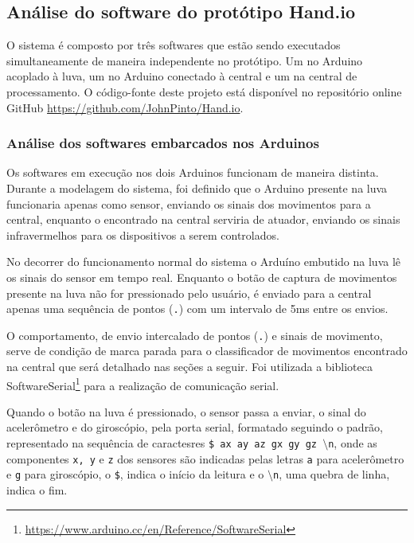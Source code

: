\subsection{Análise do software do protótipo Hand.io}

O sistema é composto por três softwares que estão sendo executados simultaneamente de maneira independente no protótipo. Um no Arduino acoplado à luva, um no Arduino conectado à central e um na central de processamento. O código-fonte deste projeto está disponível no repositório online GitHub \url{https://github.com/JohnPinto/Hand.io}.

\subsubsection{Análise dos softwares embarcados nos Arduinos}

Os softwares em execução nos dois Arduinos funcionam de maneira distinta. Durante a modelagem do sistema, foi definido que o Arduino presente na luva funcionaria apenas como sensor, enviando os sinais dos movimentos para a central, enquanto o encontrado na central serviria de atuador, enviando os sinais infravermelhos para os dispositivos a serem controlados.

No decorrer do funcionamento normal do sistema o Arduíno embutido na luva lê os sinais do sensor em tempo real. Enquanto o botão de captura de movimentos presente na luva não for pressionado pelo usuário, é enviado para a central apenas uma sequência de pontos (\texttt{.}) com um intervalo de 5ms entre os envios. 

O comportamento, de envio intercalado de pontos (\texttt{.}) e sinais de movimento, serve de condição de marca parada para o classificador de movimentos encontrado na central que será detalhado nas seções a seguir. Foi utilizada a biblioteca SoftwareSerial\footnote{\url{https://www.arduino.cc/en/Reference/SoftwareSerial}\label{ftnote:serial}} para a realização de comunicação serial.

Quando o botão na luva é pressionado, o sensor passa a enviar, o sinal do acelerômetro e do giroscópio, pela porta serial, formatado  seguindo o padrão, representado na sequência de caractesres \texttt{\$    ax    ay    az    gx    gy    gz    $\setminus $n}, onde as componentes \texttt{x, y} e \texttt{z} dos sensores são indicadas pelas letras \texttt{a} para acelerômetro e \texttt{g} para giroscópio, o \texttt{\$}, indica o início da leitura e o \texttt{$\setminus $n}, uma quebra de linha, indica o fim. 

